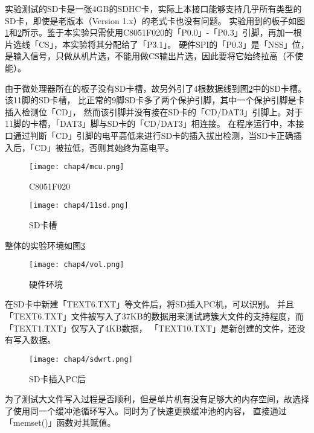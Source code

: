 实验测试的SD卡是一张4GB的SDHC卡，实际上本接口能够支持几乎所有类型的SD卡，即使是老版本（Version 1.x）的老式卡也没有问题。
实验用到的板子如图\ref{fig:mcu}和\ref{fig:11sd}所示。鉴于本实验只需使用C8051F020的「P0.0」-「P0.3」引脚，再加一根片选线「CS」，本实验将其分配给了「P3.1」。
硬件SPI的「P0.3」是「NSS」位，是输入信号，只做从机片选，不能用做CS输出片选，因此要将它始终拉高（不使能）。

由于微处理器所在的板子没有SD卡槽，故另外引了4根数据线到图\ref{fig:11sd}中的SD卡槽。
该11脚的SD卡槽，
比正常的9脚SD卡多了两个保护引脚，其中一个保护引脚是卡插入检测位「CD」，
然而该引脚并没有接在SD卡的「CD/DAT3」引脚上。对于11脚的卡槽，「DAT3」脚与SD卡的「CD/DAT3」相连接。
在程序运行中，本接口通过判断「CD」引脚的电平高低来进行SD卡的插入拔出检测，当SD卡正确插入后，「CD」被拉低，否则其始终为高电平。

\begin{figure}[!htbp]
    \centering
    \texttt{[image: chap4/mcu.png]}
    \\
    \caption{C8051F020} \label{fig:mcu}
\end{figure}

\begin{figure}[!htbp]
    \centering
    \texttt{[image: chap4/11sd.png]}
    \\
    \caption{SD卡槽} \label{fig:11sd}
\end{figure}

整体的实验环境如图\ref{fig:vol}

\begin{figure}[!htbp]
    \centering
    \texttt{[image: chap4/vol.png]}
    \\
    \caption{硬件环境} \label{fig:vol}
\end{figure}

在SD卡中新建「TEXT6.TXT」等文件后，将SD插入PC机，可以识别。
并且「TEXT6.TXT」文件被写入了37KB的数据用来测试跨簇大文件的支持程度，而「TEXT1.TXT」仅写入了4KB数据，
「TEXT10.TXT」是新创建的文件，还没有写入数据。

\begin{figure}[!htbp]
    \centering
    \texttt{[image: chap4/sdwrt.png]}
    \\
    \caption{SD卡插入PC后} \label{fig:sdwrt}
\end{figure}

为了测试大文件写入过程是否顺利，但是单片机有没有足够大的内存空间，故选择了使用同一个缓冲池循环写入。同时为了快速更换缓冲池的内容，
直接通过「memset()」函数对其赋值。


